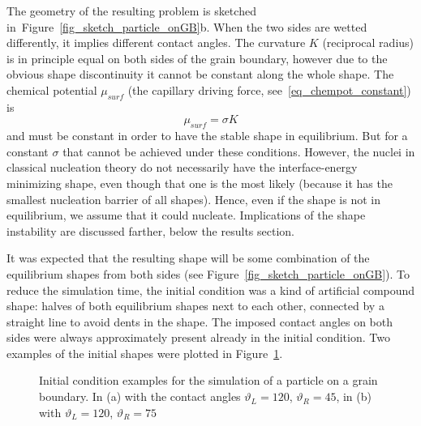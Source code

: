 The geometry of the resulting problem is sketched in~Figure~\ref{fig_sketch_particle_onGB}b. When the two sides are wetted differently, it implies different contact angles. The curvature $K$ (reciprocal radius) is in principle equal on both sides of the grain boundary, however due to the obvious shape discontinuity it cannot be constant along the whole shape. The chemical potential $\mu_{surf}$ (the capillary driving force, see~\eqref{eq_chempot_constant}) is
\begin{equation}
	\mu_{surf} = \sigma K 
\end{equation}
and must be constant in order to have the stable shape in equilibrium. But for a constant $\sigma$ that cannot be achieved under these conditions. However, the nuclei in classical nucleation theory do not necessarily have the interface-energy minimizing shape, even though that one is the most likely (because it has the smallest nucleation barrier of all shapes). Hence, even if the shape is not in equilibrium, we assume that it could nucleate. Implications of the shape instability are discussed farther, below the results section. 

It was expected that the resulting shape will be some combination of the equilibrium shapes from both sides (see Figure~\ref{fig_sketch_particle_onGB}). To reduce the simulation time, the initial condition was a kind of artificial compound shape: halves of both equilibrium shapes next to each other, connected by a straight line to avoid dents in the shape. The imposed contact angles on both sides were always approximately present already in the initial condition. Two examples of the initial shapes were plotted in Figure~\ref{fig_IC_particle_onGB}.
 
 \begin{figure}
 	\centering
 	\caption[Initial condition examples for the simulation of a particle on a grain boundary]{Initial condition examples for the simulation of a particle on a grain boundary. In (a) with the contact angles $\vartheta_L = 120$\textdegree, $\vartheta_R = 45$\textdegree, in (b) with $\vartheta_L = 120$\textdegree, $\vartheta_R = 75$\textdegree}
 	\label{fig_IC_particle_onGB}
 \end{figure}

